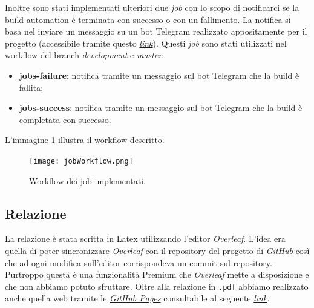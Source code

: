 Inoltre sono stati implementati ulteriori due \textit{job} con lo scopo di notificarci se la build automation è terminata con successo o con un fallimento. La notifica si basa nel inviare un messaggio su un bot Telegram realizzato appositamente per il progetto (accessibile tramite questo \href{https://telegram.me/AzureHealthcareNotificator_bot}{\textit{link}}). Questi \textit{job} sono stati utilizzati nel workflow del branch \textit{development} e \textit{master}.
\begin{itemize}
    \item \textbf{jobs-failure}: notifica tramite un messaggio sul bot Telegram che la build è fallita;  
    
    \item \textbf{jobs-success}: notifica tramite un messaggio sul bot Telegram che la build è completata con successo.  
\end{itemize}

L'immagine \ref{pic:job-workflow} illustra il workflow descritto.

\begin{figure}[ht]
    \texttt{[image: jobWorkflow.png]}
    \centering
    \caption{\label{pic:job-workflow}Workflow dei job implementati.}
\end{figure}

\subsection{Relazione}
La relazione è stata scritta in Latex utilizzando l'editor  \href{https://it.overleaf.com/}{\textit{Overleaf}}. L'idea era quella di poter sincronizzare \textit{Overleaf} con il repository del progetto di \textit{GitHub} così che ad ogni modifica sull'editor corrispondeva un commit sul repository. Purtroppo questa è una funzionalità Premium che \textit{Overleaf} mette a disposizione e che non abbiamo potuto sfruttare. Oltre alla relazione in \texttt{.pdf} abbiamo realizzato anche quella web tramite le \href{https://pages.github.com/}{\textit{GitHub Pages}} consultabile al seguente \href{https://lucagiorgettismp.github.io/AzureHealthcareDigitalTwins/}{\textit{link}}.

